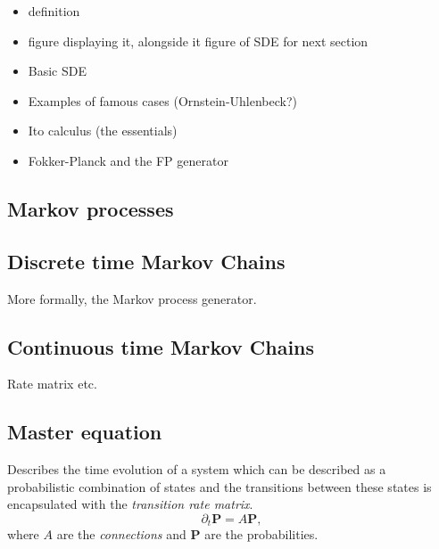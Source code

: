 \begin{definition}
	
\end{definition}

\begin{definition}
	
\end{definition}

\begin{definition}[It\^ o integral]
	
\end{definition}

\begin{itemize}
	\item definition
	\item figure displaying it, alongside it figure of SDE for next section
\end{itemize}

\begin{itemize}
	\item Basic SDE
	\item Examples of famous cases (Ornstein-Uhlenbeck?)
	\item Ito calculus (the essentials)
	\item Fokker-Planck and the FP generator
\end{itemize}

\subsection{Markov processes}
\subsection{Discrete time Markov Chains}
More formally, the Markov process generator.

\subsection{Continuous time Markov Chains}
Rate matrix etc.

\subsection{Master equation}
Describes the time evolution of a system which can be described as a probabilistic combination of states and the transitions between these states is encapsulated with the \emph{transition rate matrix}.
\begin{equation}
	\partial_{t} \mathbf{P} = A \mathbf{P},
\end{equation}
where $A$ are the \emph{connections} and $\mathbf{P}$ are the probabilities.  

